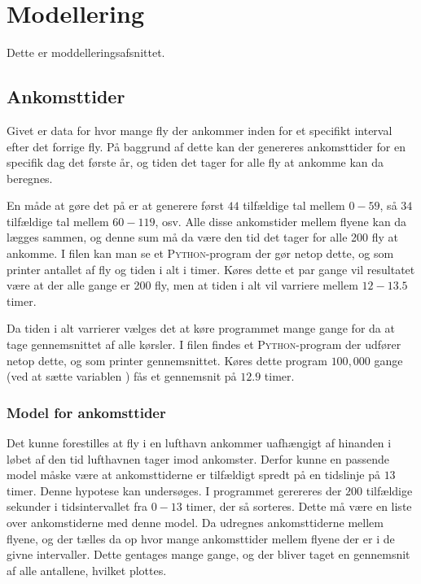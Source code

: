 \chapter{Modellering}
Dette er moddelleringsafsnittet.
\section{Ankomsttider}
Givet er data for hvor mange fly der ankommer inden for et specifikt interval efter det forrige fly. På baggrund af dette kan der genereres ankomsttider for en specifik dag det første år, og tiden det tager for alle fly at ankomme kan da beregnes.

En måde at gøre det på er at generere først $44$ tilfældige tal mellem $0 - 59$, så $34$ tilfældige tal mellem $60 - 119$, osv. Alle disse ankomstider mellem flyene kan da lægges sammen, og denne sum må da være den tid det tager for alle 200 fly at ankomme.
I filen  kan man se et \textsc{Python}-program der gør netop dette, og som printer antallet af fly og tiden i alt i timer.
Køres dette et par gange vil resultatet være at der alle gange er 200 fly, men at tiden i alt vil varriere mellem $12 - 13.5$ timer.

Da tiden i alt varrierer vælges det at køre programmet mange gange for da at tage gennemsnittet af alle kørsler.
I filen  findes et \textsc{Python}-program der udfører netop dette, og som printer gennemsnittet. Køres dette program $100,000$ gange (ved at sætte variablen ) fås et gennemsnit på $12.9$ timer.

\subsection{Model for ankomsttider} \label{chap:model_arrival_times}
Det kunne forestilles at fly i en lufthavn ankommer uafhængigt af hinanden i løbet af den tid lufthavnen tager imod ankomster.
Derfor kunne en passende model måske være at ankomsttiderne er tilfældigt spredt på en tidslinje på $13$ timer.
Denne hypotese kan undersøges.
I programmet  gerereres der $200$ tilfældige sekunder i tidsintervallet fra $0 - 13$ timer, der så sorteres. Dette må være en liste over ankomstiderne med denne model.
Da udregnes ankomsttiderne mellem flyene, og der tælles da op hvor mange ankomsttider mellem flyene der er i de givne intervaller.
Dette gentages mange gange, og der bliver taget en gennemsnit af alle antallene, hvilket plottes.

